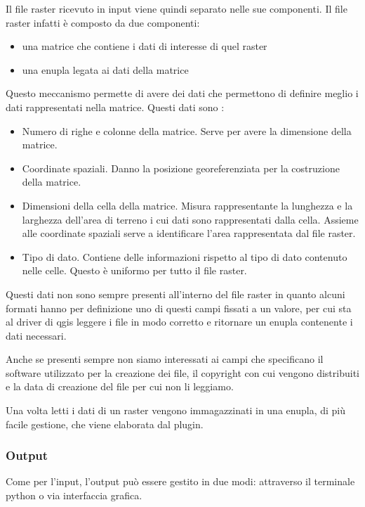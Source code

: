 Il file raster ricevuto in input viene quindi separato nelle sue componenti. Il file raster infatti è composto da due componenti: 
\begin{itemize}
	\item una matrice che contiene i dati di interesse di quel raster
	\item una enupla legata ai dati della matrice
\end{itemize}
Questo meccanismo permette di avere dei dati che permettono di definire meglio i dati rappresentati nella matrice. Questi dati sono :

\begin{itemize}
	\item Numero di righe e colonne della matrice. Serve per avere la dimensione della matrice.
	\item Coordinate spaziali. Danno la posizione georeferenziata per la costruzione della matrice.
	\item Dimensioni della cella della matrice. Misura rappresentante la lunghezza e la larghezza dell'area di terreno i cui dati sono rappresentati dalla cella. Assieme alle coordinate spaziali serve a identificare l'area rappresentata dal file raster.
	\item Tipo di dato. Contiene delle informazioni rispetto al tipo di dato contenuto nelle celle. Questo è uniformo per tutto il file raster.
\end{itemize}

Questi dati non sono sempre presenti all'interno del file raster in quanto alcuni formati hanno per definizione uno di questi campi fissati a un valore, per cui sta al driver di qgis leggere i file in modo corretto e ritornare un enupla contenente i dati necessari.

Anche se presenti sempre non siamo interessati ai campi che specificano il software utilizzato per la creazione dei file, il copyright con cui vengono distribuiti e la data di creazione del file per cui non li leggiamo.

Una volta letti i dati di un raster vengono immagazzinati in una enupla, di più facile gestione, che viene elaborata dal plugin.

\subsubsection{Output}
Come per l'input, l'output può essere gestito in due modi: attraverso il terminale python o via interfaccia grafica.

